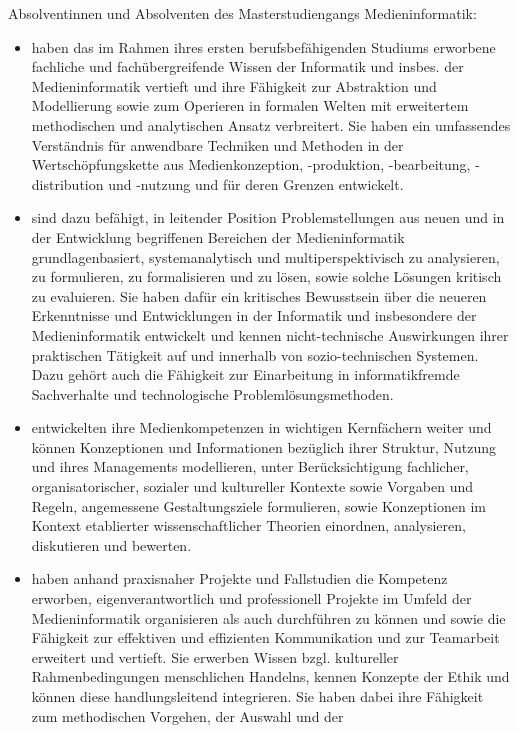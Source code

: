 Absolventinnen und Absolventen des Masterstudiengangs Medieninformatik:

\begin{itemize}
\tightlist
\item
  haben das im Rahmen ihres ersten berufsbefähigenden Studiums erworbene
  fachliche und fachübergreifende Wissen der Informatik und insbes. der
  Medieninformatik vertieft und ihre Fähigkeit zur Abstraktion und
  Modellierung sowie zum Operieren in formalen Welten mit erweitertem
  methodischen und analytischen Ansatz verbreitert. Sie haben ein
  umfassendes Verständnis für anwendbare Techniken und Methoden in der
  Wertschöpfungskette aus Medienkonzeption, -produktion, -bearbeitung,
  -distribution und -nutzung und für deren Grenzen entwickelt.
\item
  sind dazu befähigt, in leitender Position Problemstellungen aus neuen
  und in der Entwicklung begriffenen Bereichen der Medieninformatik
  grundlagenbasiert, systemanalytisch und multiperspektivisch zu
  analysieren, zu formulieren, zu formalisieren und zu lösen, sowie
  solche Lösungen kritisch zu evaluieren. Sie haben dafür ein kritisches
  Bewusstsein über die neueren Erkenntnisse und Entwicklungen in der
  Informatik und insbesondere der Medieninformatik entwickelt und kennen
  nicht-technische Auswirkungen ihrer praktischen Tätigkeit auf und
  innerhalb von sozio-technischen Systemen. Dazu gehört auch die
  Fähigkeit zur Einarbeitung in informatikfremde Sachverhalte und
  technologische Problemlösungsmethoden.
\item
  entwickelten ihre Medienkompetenzen in wichtigen Kernfächern weiter
  und können Konzeptionen und Informationen bezüglich ihrer Struktur,
  Nutzung und ihres Managements modellieren, unter Berücksichtigung
  fachlicher, organisatorischer, sozialer und kultureller Kontexte sowie
  Vorgaben und Regeln, angemessene Gestaltungsziele formulieren, sowie
  Konzeptionen im Kontext etablierter wissenschaftlicher Theorien
  einordnen, analysieren, diskutieren und bewerten.
\item
  haben anhand praxisnaher Projekte und Fallstudien die Kompetenz
  erworben, eigenverantwortlich und professionell Projekte im Umfeld der
  Medieninformatik organisieren als auch durchführen zu können und sowie
  die Fähigkeit zur effektiven und effizienten Kommunikation und zur
  Teamarbeit erweitert und vertieft. Sie erwerben Wissen bzgl.
  kultureller Rahmenbedingungen menschlichen Handelns, kennen Konzepte
  der Ethik und können diese handlungsleitend integrieren. Sie haben
  dabei ihre Fähigkeit zum methodischen Vorgehen, der Auswahl und der

\end{itemize}
